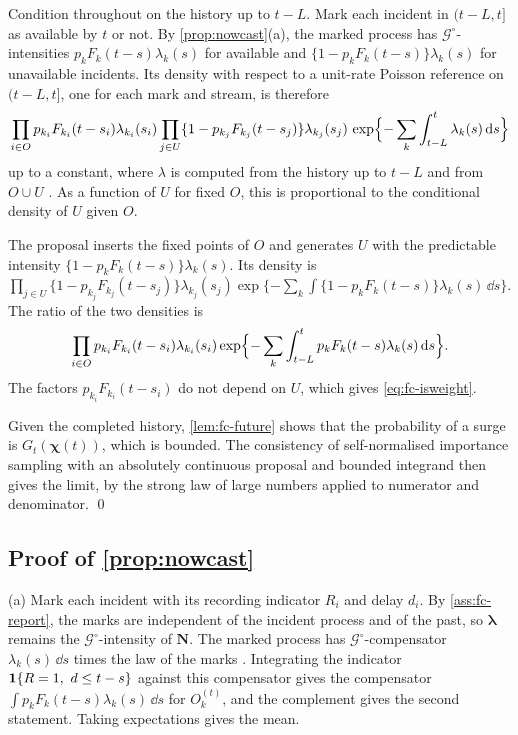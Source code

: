 Condition throughout on the history up to $t-L$. Mark each incident in $(t-L,t]$ as
available by $t$ or not. By \cref{prop:nowcast}(a), the marked process has
$\mathcal G^\circ$-intensities $p_kF_k(t-s)\lambda_k(s)$ for available and
$\{1-p_kF_k(t-s)\}\lambda_k(s)$ for unavailable incidents. Its density with respect to
a unit-rate Poisson reference on $(t-L,t]$, one for each mark and stream, is therefore
\[
\prod_{i\in O}p_{k_i}F_{k_i}(t-s_i)\lambda_{k_i}(s_i)
\prod_{j\in U}\{1-p_{k_j}F_{k_j}(t-s_j)\}\lambda_{k_j}(s_j)\,
\exp\Bigl\{-\sum_k\int_{t-L}^t\lambda_k(s)\,\mathrm{d} s\Bigr\}
\]
up to a constant, where $\lambda$ is computed from the history up to $t-L$ and from
$O\cup U$ \citep[Ch.~7]{daley2003}. As a function of $U$ for fixed $O$, this is
proportional to the conditional density of $U$ given $O$.

The proposal inserts the fixed points of $O$ and generates $U$ with the predictable
intensity $\{1-p_kF_k(t-s)\}\lambda_k(s)$. Its density is
$\prod_{j\in U}\{1-p_{k_j}F_{k_j}(t-s_j)\}\lambda_{k_j}(s_j)\exp\{-\sum_k\int\{1-p_kF_k(t-s)\}\lambda_k(s)\,\dd s\}$.
The ratio of the two densities is
\[
\prod_{i\in O}p_{k_i}F_{k_i}(t-s_i)\lambda_{k_i}(s_i)
\exp\Bigl\{-\sum_k\int_{t-L}^tp_kF_k(t-s)\lambda_k(s)\,\mathrm{d} s\Bigr\}.
\]
The factors $p_{k_i}F_{k_i}(t-s_i)$ do not depend on $U$, which gives
\eqref{eq:fc-isweight}.

Given the completed history, \cref{lem:fc-future} shows that the probability of a surge
is $G_t(\bm\chi(t))$, which is bounded. The consistency of self-normalised importance
sampling with an absolutely continuous proposal and bounded integrand then gives the
limit, by the strong law of large numbers applied to numerator and denominator. \qed

\subsection{Proof of \texorpdfstring{\cref{prop:nowcast}}{the nowcasting proposition}}\label{app:fc-nowcast}

(a) Mark each incident with its recording indicator $R_i$ and delay $d_i$. By
\cref{ass:fc-report}, the marks are independent of the incident process and of the
past, so $\bm\lambda$ remains the $\mathcal G^\circ$-intensity of $\bm N$. The marked
process has $\mathcal G^\circ$-compensator $\lambda_k(s)\,\dd s$ times the law of the
marks \citep[Ch.~6--7]{daley2003}. Integrating the indicator
$\mathbf{1}\!\left\{R=1,\ d\le t-s\right\}$ against this compensator gives the compensator
$\int p_kF_k(t-s)\lambda_k(s)\,\dd s$ for $O^{(t)}_k$, and the complement gives the
second statement. Taking expectations gives the mean.

